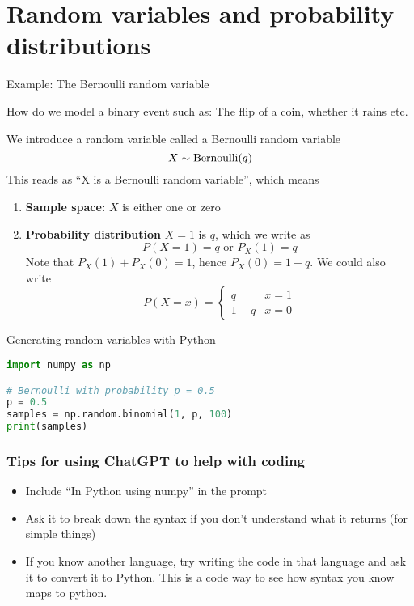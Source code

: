 \section{Random variables and probability distributions}
\begin{frame}{Example: The Bernoulli random variable}

How do we model a binary event such as: The flip of a coin, whether it rains etc. 

We introduce a random variable called a Bernoulli random variable 
\begin{equation*}
X \sim {\rm Bernoulli}(q)
\end{equation*}
This reads as ``X is a Bernoulli random variable'', which means
\begin{enumerate}
\item  {\bf Sample space:} $X$ is either one or zero 
\item {\bf Probability distribution} $X=1$ is $q$, which we write as
\begin{equation*}
P(X = 1) = q \text{  or  } P_X(1) = q
\end{equation*}
Note that $P_X(1) + P_X(0) = 1$, hence $P_X(0) = 1-q$. We could also write
\begin{equation*}
P(X = x)  = \left\{\begin{array}{lr}
q & x =1\\
1-q & x =0
 \end{array} \right.
\end{equation*}
\end{enumerate}


\end{frame}


\begin{frame}[fragile]{Generating random variables with Python}
\begin{lstlisting}[language=Python]
import numpy as np

# Bernoulli with probability p = 0.5
p = 0.5
samples = np.random.binomial(1, p, 100)
print(samples)
\end{lstlisting}
\end{frame}


\begin{frame}
\frametitle{Tips for using ChatGPT to help with coding} 
\begin{itemize}
\item Include ``In Python using numpy'' in the prompt
\item Ask it to break down the syntax if you don't understand what it returns (for simple things)
\item If you know another language, try writing the code in that language and ask it to convert it to Python. This is a code way to see how syntax you know maps to python. 
\end{itemize}

\end{frame}


